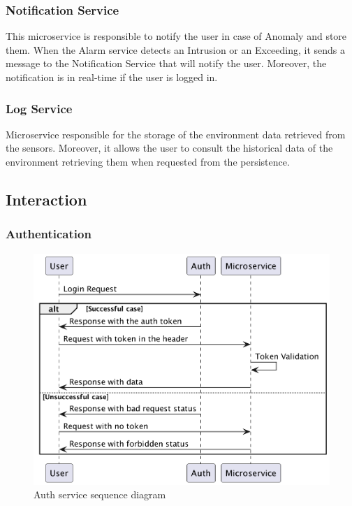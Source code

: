 \documentclass{scrartcl}
\begin{document}
    \subsubsection{Notification Service}
    This microservice is responsible to notify the user in case of Anomaly and store them.
    When the Alarm service detects an Intrusion or an Exceeding, it sends a message to the Notification Service that will notify the user.
    Moreover, the notification is in real-time if the user is logged in.

    \subsubsection{Log Service}
    Microservice responsible for the storage of the environment data retrieved from the sensors.
    Moreover, it allows the user to consult the historical data of the environment retrieving them when requested from the persistence.

    \subsection{Interaction}

    \subsubsection{Authentication}
    \begin{figure}
        \centering
        \includegraphics[scale=0.3]{img/auth-service-sequence}
        \caption{Auth service sequence diagram}
        \label{fig:auth-service-sequence}
    \end{figure}
\end{document}

